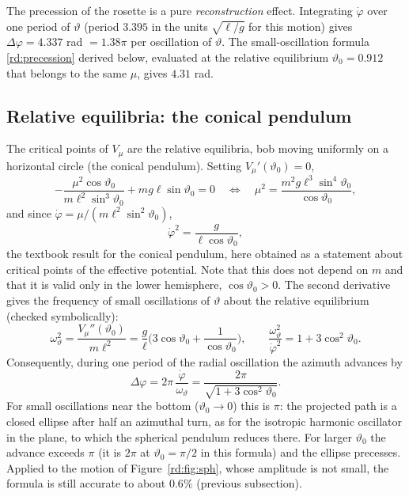 The precession of the rosette is a pure \emph{reconstruction} effect. Integrating $\dot\varphi$ over one period of $\vartheta$ (period $3.395$ in the units $\sqrt{\ell/g}$ for this motion) gives $\Delta\varphi=4.337$ rad $=1.38\pi$ per oscillation of $\vartheta$. The small-oscillation formula \eqref{rd:precession} derived below, evaluated at the relative equilibrium $\vartheta_0=0.912$ that belongs to the same $\mu$, gives $4.31$ rad.

\subsection{Relative equilibria: the conical pendulum}\label{rd:sec:conical}

The critical points of $V_\mu$ are the relative equilibria, bob moving uniformly on a horizontal circle (the conical pendulum). Setting $V_\mu'(\vartheta_0)=0$,
\[
-\frac{\mu^2\cos\vartheta_0}{m\ell^2\sin^3\vartheta_0}+mg\ell\sin\vartheta_0=0
\quad\Longleftrightarrow\quad
\mu^2=\frac{m^2g\ell^3\sin^4\vartheta_0}{\cos\vartheta_0},
\]
and since $\dot\varphi=\mu/(m\ell^2\sin^2\vartheta_0)$,
\begin{equation}\label{rd:conical}
\dot\varphi^2=\frac{g}{\ell\cos\vartheta_0},
\end{equation}
the textbook result for the conical pendulum, here obtained as a statement about critical points of the effective potential. Note that this does not depend on $m$ and that it is valid only in the lower hemisphere, $\cos\vartheta_0>0$. The second derivative gives the frequency of small oscillations of $\vartheta$ about the relative equilibrium (checked symbolically):
\begin{equation}\label{rd:omegatheta}
\omega_\vartheta^2=\frac{V_\mu''(\vartheta_0)}{m\ell^2}=\frac g\ell\Big(3\cos\vartheta_0+\frac1{\cos\vartheta_0}\Big),
\qquad\frac{\omega_\vartheta^2}{\dot\varphi^2}=1+3\cos^2\vartheta_0 .
\end{equation}
Consequently, during one period of the radial oscillation the azimuth advances by
\begin{equation}\label{rd:precession}
\Delta\varphi=2\pi\,\frac{\dot\varphi}{\omega_\vartheta}=\frac{2\pi}{\sqrt{1+3\cos^2\vartheta_0}} .
\end{equation}
For small oscillations near the bottom ($\vartheta_0\to0$) this is $\pi$: the projected path is a closed ellipse after half an azimuthal turn, as for the isotropic harmonic oscillator in the plane, to which the spherical pendulum reduces there. For larger $\vartheta_0$ the advance exceeds $\pi$ (it is $2\pi$ at $\vartheta_0=\pi/2$ in this formula) and the ellipse precesses. Applied to the motion of Figure~\ref{rd:fig:sph}, whose amplitude is not small, the formula is still accurate to about $0.6\%$ (previous subsection).

